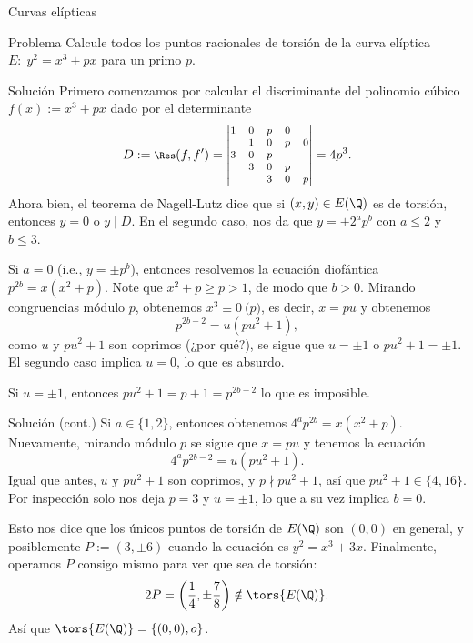 \documentclass[handout, 10pt]{beamer}
\begin{document}
\begin{frame}{Curvas elípticas}
	\begin{block}{Problema}
		Calcule todos los puntos racionales de torsión de la curva elíptica $E\colon \; y^2 = x^3 + px$ para un primo $p$.
	\end{block}
\end{frame}
\begin{frame}{Solución}
	Primero comenzamos por calcular el discriminante del polinomio cúbico $f(x) := x^3 + px$
	\pause
	dado por el determinante
	\[
		\footnotesize
		D := \Res(f, f') =
		\begin{vmatrix}
			1 & 0 & p & 0 \\
			  & 1 & 0 & p & 0 \\
			3 & 0 & p \\
			  & 3 & 0 & p \\
			  &   & 3 & 0 & p
		\end{vmatrix}
		= 4p^3.
	\]
	\pause
	Ahora bien, el teorema de Nagell-Lutz dice que si $(x, y) \in E(\Q)$ es de torsión, entonces $y = 0$ o $y \mid D$.
	En el segundo caso, nos da que $y = \pm 2^a p^b$ con $a \le 2$ y $b \le 3$.

	\pause
	Si $a = 0$ (i.e., $y = \pm p^b$), entonces resolvemos la ecuación diofántica $p^{2b} = x(x^2 + p)$.
	\pause
	Note que $x^2 + p \ge p > 1$, de modo que $b > 0$.
	\pause
	Mirando congruencias módulo $p$, obtenemos $x^3 \equiv 0 \pod p$, es decir, $x = pu$ y obtenemos
	\[
		p^{2b-2} = u(pu^2 + 1),
	\]
	\pause
	como $u$ y $pu^2 + 1$ son coprimos (¿por qué?), se sigue que $u = \pm 1$ o $pu^2 + 1 = \pm 1$.
	El segundo caso implica $u = 0$, lo que es absurdo.

	\pause
	Si $u = \pm 1$, entonces $pu^2 + 1 = p + 1 = p^{2b-2}$ lo que es imposible.
\end{frame}

\begin{frame}{Solución (cont.)}
	Si $a \in \{ 1, 2 \}$, entonces obtenemos $4^a p^{2b} = x(x^2 + p)$.
	Nuevamente, mirando módulo $p$ se sigue que $x = pu$ y tenemos la ecuación
	\[
		4^a p^{2b-2} = u(pu^2 + 1).
	\]
	\pause
	Igual que antes, $u$ y $pu^2 + 1$ son coprimos, y $p \nmid pu^2 + 1$,
	así que $pu^2 + 1 \in \{ 4, 16 \}$.
	\pause
	Por inspección solo nos deja $p = 3$ y $u = \pm 1$, lo que a su vez implica $b = 0$.

	\pause
	Esto nos dice que los únicos puntos de torsión de $E(\Q)$ son $(0, 0)$ en general,
	y posiblemente $P := (3, \pm 6)$ cuando la ecuación es $y^2 = x^3 + 3x$.
	\pause
	Finalmente, operamos $P$ consigo mismo para ver que sea de torsión:
	\[
		2P = \left(\frac{1}{4}, \pm\frac{7}{8}\right) \notin \tors{E(\Q)}.
	\]
	Así que $\tors{E(\Q)} = \{ (0, 0), o \}$.
\end{frame}

\printbibliography
\end{document}
